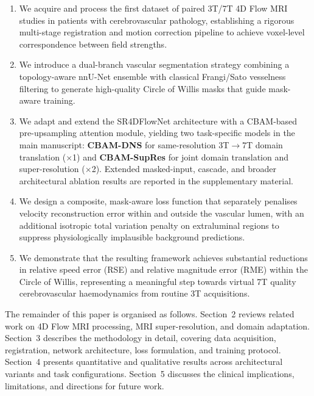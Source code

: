 \documentclass[11pt]{article}
\begin{document}
\begin{enumerate}
    \item We acquire and process the first dataset of paired 3T/7T 4D Flow MRI studies in patients with cerebrovascular pathology, establishing a rigorous multi-stage registration and motion correction pipeline to achieve voxel-level correspondence between field strengths.

    \item We introduce a dual-branch vascular segmentation strategy combining a topology-aware nnU-Net ensemble \cite{isensee2021nnunet,yang2023topcow} with classical Frangi/Sato vesselness filtering \cite{frangi1998,sato1998} to generate high-quality Circle of Willis masks that guide mask-aware training.

    \item We adapt and extend the SR4DFlowNet architecture \cite{ferdian2020,elahmar2023} with a CBAM-based pre-upsampling attention module, yielding two task-specific models in the main manuscript: \textbf{CBAM-DNS} for same-resolution 3T$\to$7T domain translation ($\times$1) and \textbf{CBAM-SupRes} for joint domain translation and super-resolution ($\times$2). Extended masked-input, cascade, and broader architectural ablation results are reported in the supplementary material.

    \item We design a composite, mask-aware loss function that separately penalises velocity reconstruction error within and outside the vascular lumen, with an additional isotropic total variation penalty \cite{rudin1992tv} on extraluminal regions to suppress physiologically implausible background predictions.

    \item We demonstrate that the resulting framework achieves substantial reductions in relative speed error (RSE) and relative magnitude error (RME) within the Circle of Willis, representing a meaningful step towards virtual 7T quality cerebrovascular haemodynamics from routine 3T acquisitions.
\end{enumerate}

The remainder of this paper is organised as follows. Section~2 reviews related work on 4D Flow MRI processing, MRI super-resolution, and domain adaptation. Section~3 describes the methodology in detail, covering data acquisition, registration, network architecture, loss formulation, and training protocol. Section~4 presents quantitative and qualitative results across architectural variants and task configurations. Section~5 discusses the clinical implications, limitations, and directions for future work.
\end{document}
